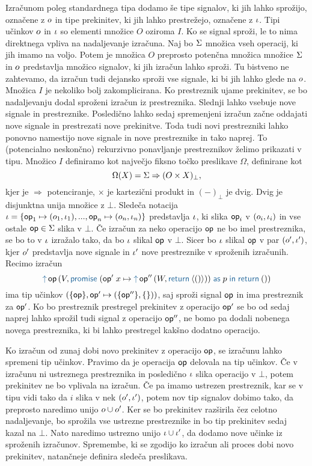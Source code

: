 Izračunom poleg standardnega tipa dodamo še tipe signalov, ki jih lahko sprožijo, označene z $o$ in tipe prekinitev, ki jih lahko prestrežejo, označene z $\iota$.
Tipi učinkov $o$ in $\iota$ so elementi množice $O$ oziroma $I$.
Ko se signal sproži, le to nima direktnega vpliva na nadaljevanje izračuna. Naj bo $\Sigma$ množica vseh operacij, ki jih imamo na voljo. Potem je množica $O$ preprosto potenčna množica množice $\Sigma$ in $o$ predstavlja množico signalov, ki jih izračun lahko sproži. Tu bistveno ne zahtevamo, da izračun tudi dejansko sproži vse signale, ki bi jih lahko glede na $o$.  
Množica $I$ je nekoliko bolj zakomplicirana. Ko prestreznik ujame prekinitev, se bo nadaljevanju dodal sproženi izračun iz prestreznika. Slednji lahko vsebuje nove signale in prestreznike. Posledično lahko sedaj spremenjeni izračun začne oddajati nove signale in prestrezati nove prekinitve. Toda tudi novi prestrezniki lahko ponovno namestijo nove signale in nove prestreznike in tako naprej.
To (potencialno neskončno) rekurzivno ponavljanje prestreznikov želimo prikazati v tipu.
Množico $I$ definiramo kot največjo fiksno točko preslikave $\Omega$, definirane kot 
$$\Omega(X) = \Sigma \Rightarrow (O \times X)_\bot ,$$
kjer je $\Rightarrow$ potenciranje, $\times$ je kartezični produkt in $(-)_\bot$ je dvig. Dvig je disjunktna unija množice z $\bot$.
Sledeča notacija $\iota = \{\mathsf{op}_1 \mapsto (o_1,\iota_1),...,\mathsf{op}_n \mapsto (o_n, \iota_n)\}$ predstavlja $\iota$, ki slika $\mathsf{op}_i$ v $(o_i, \iota_i)$ in vse ostale $\mathsf{op} \in \Sigma$ slika v $\bot$.
Če izračun za neko operacijo $\mathsf{op}$ ne bo imel prestreznika, se bo to v $\iota$ izražalo tako, da bo $\iota$ slikal $\mathsf{op}$ v $\bot$. 
Sicer bo $\iota$ slikal $\mathsf{op}$ v par $(o', \iota')$, kjer $o'$ predstavlja nove signale in $\iota'$ nove prestreznike v sproženih izračunih.
Recimo izračun $$\tmopout{op}{V}{\tmwith{op'}{x}{\tmopout{op''}{W}{\tmreturn{\tmpromise{()}}}}{p}{\tmreturn{()}}}$$ ima tip učinkov $(\{\mathsf{op}\}, \mathsf{op}' \mapsto (\{\mathsf{op}''\},\{\}))$, saj sproži signal $\mathsf{op}$ in ima prestreznik za $\mathsf{op}'$. Ko bo prestreznik prestregel prekinitev z operacijo $\mathsf{op}'$ se bo od sedaj naprej lahko sprožil tudi signal z operacijo $\mathsf{op}''$, ne bomo pa dodali nobenega novega prestreznika, ki bi lahko prestregel kakšno dodatno operacijo.

Ko izračun od zunaj dobi novo prekinitev z operacijo $\mathsf{op}$, se izračunu lahko spremeni tip učinkov. Pravimo da je operacija $\mathsf{op}$ delovala na tip učinkov.
Če v izračunu ni ustreznega prestreznika in posledično $\iota$ slika operacijo v $\bot$, potem prekinitev ne bo vplivala na izračun.
Če pa imamo ustrezen prestreznik, kar se v tipu vidi tako da $i$ slika v nek $(o',\iota')$, potem nov tip signalov dobimo tako, da preprosto naredimo unijo $o \cup o'$. Ker se bo prekinitev razširila čez celotno nadaljevanje, bo sprožila vse ustrezne prestreznike in bo tip prekinitev sedaj kazal na $\bot$.
Nato naredimo ustrezno unijo $\iota \cup \iota'$, da dodamo nove učinke iz sproženih izračunov.
Spremembe, ki se zgodijo ko izračun ali proces dobi novo prekinitev, natančneje definira sledeča preslikava.

